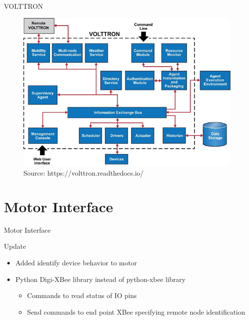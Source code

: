 \documentclass{beamer}
\begin{document}
\begin{frame}{VOLTTRON}
\begin{figure}
\centering
\includegraphics[scale=0.4]{figs/volttronoverview.png}
\caption{Source: https://volttron.readthedocs.io/}
\end{figure}
\end{frame}

\section{Motor Interface}

\begin{frame}{Motor Interface}
\begin{block}{Update}
\begin{itemize}
\item Added identify device behavior to motor
\item Python Digi-XBee library instead of python-xbee library
\begin{itemize}
	\item Commands to read status of IO pins
	\item Send commands to end point XBee specifying remote node identification
\end{itemize}
\end{itemize}
\end{block}
\end{frame}
\end{document}
